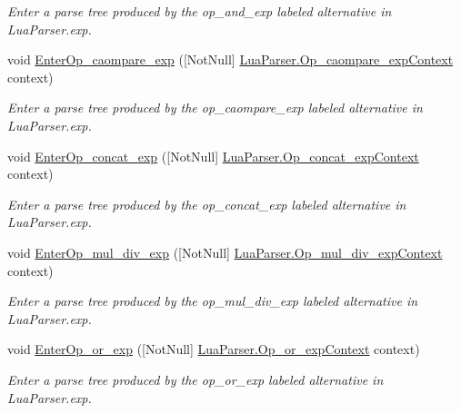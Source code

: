 \begin{DoxyCompactItemize}
\begin{DoxyCompactList}\small\item\em Enter a parse tree produced by the {\ttfamily op\+\_\+and\+\_\+exp} labeled alternative in Lua\+Parser.\+exp. \end{DoxyCompactList}\item 
void \mbox{\hyperlink{classzlua_1_1_compiler_a3ee6eb43c518439f5e6df2496d4bd45f}{Enter\+Op\+\_\+caompare\+\_\+exp}} (\mbox{[}Not\+Null\mbox{]} \mbox{\hyperlink{classzlua_1_1_lua_parser_1_1_op__caompare__exp_context}{Lua\+Parser.\+Op\+\_\+caompare\+\_\+exp\+Context}} context)
\begin{DoxyCompactList}\small\item\em Enter a parse tree produced by the {\ttfamily op\+\_\+caompare\+\_\+exp} labeled alternative in Lua\+Parser.\+exp. \end{DoxyCompactList}\item 
void \mbox{\hyperlink{classzlua_1_1_compiler_ab34e6520919145a9c302e6847e8b36b7}{Enter\+Op\+\_\+concat\+\_\+exp}} (\mbox{[}Not\+Null\mbox{]} \mbox{\hyperlink{classzlua_1_1_lua_parser_1_1_op__concat__exp_context}{Lua\+Parser.\+Op\+\_\+concat\+\_\+exp\+Context}} context)
\begin{DoxyCompactList}\small\item\em Enter a parse tree produced by the {\ttfamily op\+\_\+concat\+\_\+exp} labeled alternative in Lua\+Parser.\+exp. \end{DoxyCompactList}\item 
void \mbox{\hyperlink{classzlua_1_1_compiler_ac79e4b2008ccb00f7209a5dbc9ce7362}{Enter\+Op\+\_\+mul\+\_\+div\+\_\+exp}} (\mbox{[}Not\+Null\mbox{]} \mbox{\hyperlink{classzlua_1_1_lua_parser_1_1_op__mul__div__exp_context}{Lua\+Parser.\+Op\+\_\+mul\+\_\+div\+\_\+exp\+Context}} context)
\begin{DoxyCompactList}\small\item\em Enter a parse tree produced by the {\ttfamily op\+\_\+mul\+\_\+div\+\_\+exp} labeled alternative in Lua\+Parser.\+exp. \end{DoxyCompactList}\item 
void \mbox{\hyperlink{classzlua_1_1_compiler_a00586a6ef587aa5305c9ab8071c15d5a}{Enter\+Op\+\_\+or\+\_\+exp}} (\mbox{[}Not\+Null\mbox{]} \mbox{\hyperlink{classzlua_1_1_lua_parser_1_1_op__or__exp_context}{Lua\+Parser.\+Op\+\_\+or\+\_\+exp\+Context}} context)
\begin{DoxyCompactList}\small\item\em Enter a parse tree produced by the {\ttfamily op\+\_\+or\+\_\+exp} labeled alternative in Lua\+Parser.\+exp. \end{DoxyCompactList}\item 

\end{DoxyCompactItemize}

